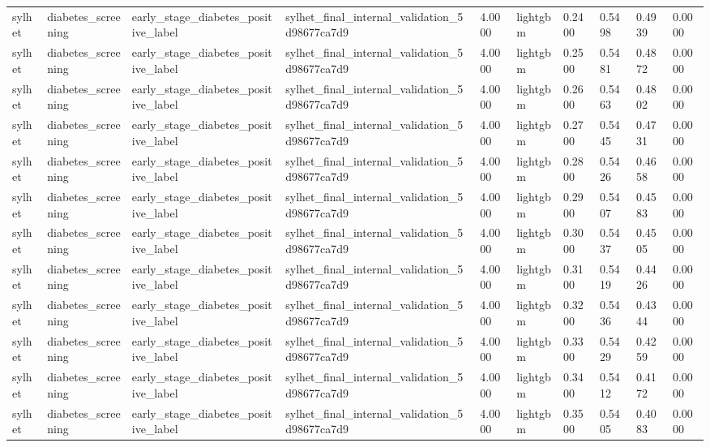 \begin{tabular}{llllllllll}
sylhet & diabetes\_screening & early\_stage\_diabetes\_positive\_label & sylhet\_final\_internal\_validation\_5d98677ca7d9 & 4.0000 & lightgbm & 0.2400 & 0.5498 & 0.4939 & 0.0000 \\
sylhet & diabetes\_screening & early\_stage\_diabetes\_positive\_label & sylhet\_final\_internal\_validation\_5d98677ca7d9 & 4.0000 & lightgbm & 0.2500 & 0.5481 & 0.4872 & 0.0000 \\
sylhet & diabetes\_screening & early\_stage\_diabetes\_positive\_label & sylhet\_final\_internal\_validation\_5d98677ca7d9 & 4.0000 & lightgbm & 0.2600 & 0.5463 & 0.4802 & 0.0000 \\
sylhet & diabetes\_screening & early\_stage\_diabetes\_positive\_label & sylhet\_final\_internal\_validation\_5d98677ca7d9 & 4.0000 & lightgbm & 0.2700 & 0.5445 & 0.4731 & 0.0000 \\
sylhet & diabetes\_screening & early\_stage\_diabetes\_positive\_label & sylhet\_final\_internal\_validation\_5d98677ca7d9 & 4.0000 & lightgbm & 0.2800 & 0.5426 & 0.4658 & 0.0000 \\
sylhet & diabetes\_screening & early\_stage\_diabetes\_positive\_label & sylhet\_final\_internal\_validation\_5d98677ca7d9 & 4.0000 & lightgbm & 0.2900 & 0.5407 & 0.4583 & 0.0000 \\
sylhet & diabetes\_screening & early\_stage\_diabetes\_positive\_label & sylhet\_final\_internal\_validation\_5d98677ca7d9 & 4.0000 & lightgbm & 0.3000 & 0.5437 & 0.4505 & 0.0000 \\
sylhet & diabetes\_screening & early\_stage\_diabetes\_positive\_label & sylhet\_final\_internal\_validation\_5d98677ca7d9 & 4.0000 & lightgbm & 0.3100 & 0.5419 & 0.4426 & 0.0000 \\
sylhet & diabetes\_screening & early\_stage\_diabetes\_positive\_label & sylhet\_final\_internal\_validation\_5d98677ca7d9 & 4.0000 & lightgbm & 0.3200 & 0.5436 & 0.4344 & 0.0000 \\
sylhet & diabetes\_screening & early\_stage\_diabetes\_positive\_label & sylhet\_final\_internal\_validation\_5d98677ca7d9 & 4.0000 & lightgbm & 0.3300 & 0.5429 & 0.4259 & 0.0000 \\
sylhet & diabetes\_screening & early\_stage\_diabetes\_positive\_label & sylhet\_final\_internal\_validation\_5d98677ca7d9 & 4.0000 & lightgbm & 0.3400 & 0.5412 & 0.4172 & 0.0000 \\
sylhet & diabetes\_screening & early\_stage\_diabetes\_positive\_label & sylhet\_final\_internal\_validation\_5d98677ca7d9 & 4.0000 & lightgbm & 0.3500 & 0.5405 & 0.4083 & 0.0000 \\

\end{tabular}
